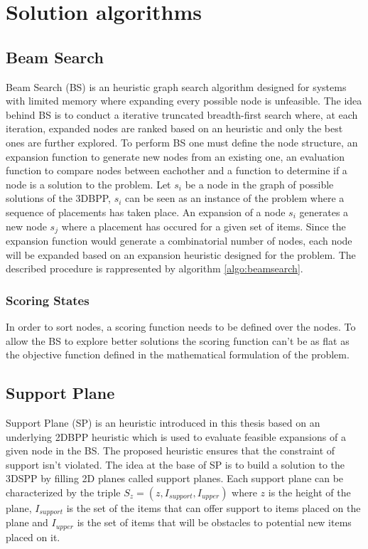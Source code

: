 \chapter{Solution algorithms}\label{chapter:heuristics}
\section{Beam Search}\label{chapter:heuristics:beamsearch}
Beam Search (BS) %
is an heuristic graph search algorithm designed for systems with limited memory where expanding every possible node is unfeasible.
The idea behind BS is to conduct a iterative truncated breadth-first search where, at each iteration, expanded nodes are ranked based on an heuristic and only the best ones are further explored.
To perform BS one must define the node structure, an expansion function to generate new nodes from an existing one, an evaluation function to compare nodes between eachother and a function to determine if a node is a solution to the problem.
Let $s_i$ be a node in the graph of possible solutions of the 3DBPP, %
$s_i$ can be seen as an instance of the problem where a sequence of placements has taken place.
An expansion of a node $s_i$ generates a new node $s_j$ where a placement has occured for a given set of items.
Since the expansion function would generate a combinatorial number of nodes, each node will be expanded based on an expansion heuristic designed for the problem.
The described procedure is rappresented by algorithm \ref{algo:beamsearch}.






\subsection{Scoring States}\label{chapter:heuristics:beamsearch:scoring}
In order to sort nodes, a scoring function needs to be defined over the nodes. 
To allow the BS to explore better solutions the scoring function can't be as flat as the objective function defined in the mathematical formulation of the problem. %

\section{Support Plane}\label{chapter:heuristics:supportplane}
Support Plane (SP) is an heuristic introduced in this thesis based on an underlying 2DBPP heuristic which is used to evaluate feasible expansions of a given node in the BS.
The proposed heuristic ensures that the constraint of support isn't violated.
The idea at the base of SP is to build a solution to the 3DSPP by filling 2D planes called support planes.
Each support plane can be characterized by the triple $S_z = (z, I_{support}, I_{upper})$ where $z$ is the height of the plane, $I_{support}$ is the set of the items that can offer support to items placed on the plane %
and $I_{upper}$ is the set of items that will be obstacles to potential new items placed on it.

